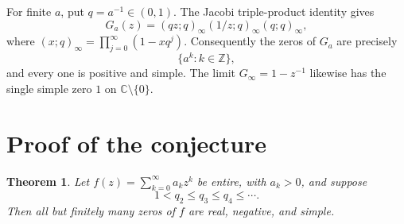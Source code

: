 \documentclass[11pt]{article}
\newtheorem{theorem}{Theorem}
\newcommand{\C}{\mathbb C}
\newcommand{\Z}{\mathbb Z}
\begin{document}
For finite $a$, put $q=a^{-1}\in(0,1)$.  The Jacobi triple-product
identity gives
\begin{equation}\label{eq:triple}
 G_a(z)=(qz;q)_\infty(1/z;q)_\infty(q;q)_\infty,
\end{equation}
where $(x;q)_\infty=\prod_{j=0}^{\infty}(1-xq^j)$.  Consequently the
zeros of $G_a$ are precisely
\begin{equation}\label{eq:limitzeros}
 \{a^k:k\in\Z\},
\end{equation}
and every one is positive and simple.  The limit $G_\infty=1-z^{-1}$
likewise has the single simple zero $1$ on $\C\setminus\{0\}$.

\section{Proof of the conjecture}

\begin{theorem}\label{thm:main}
Let $f(z)=\sum_{k=0}^{\infty}a_kz^k$ be entire, with $a_k>0$, and suppose
\[
 1<q_2\leq q_3\leq q_4\leq\cdots.
\]
Then all but finitely many zeros of $f$ are real, negative, and simple.
\end{theorem}
\end{document}
